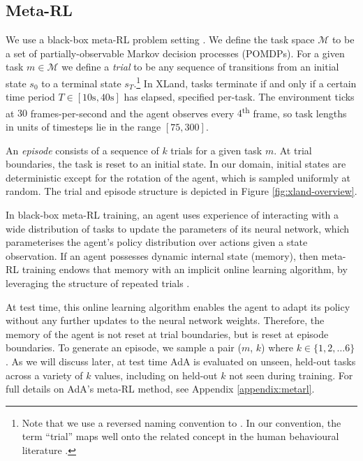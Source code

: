 \subsection{Meta-RL} \label{sec:methods_problem} 

We use a black-box meta-RL problem setting \citep{duan2017rl, wang2016learning}. We define the task space $\mathcal{M}$ to be a set of partially-observable Markov decision processes (POMDPs). For a given task $m \in \mathcal{M}$ we define a \emph{trial} to be any sequence of transitions from an initial state $s_0$ to a terminal state $s_T$.\footnote{Note that we use a reversed naming convention to \citet{duan2017rl}. In our convention, the term ``trial'' maps well onto the related concept in the human behavioural literature \citep{barbosa2022practical}.} In XLand, tasks terminate if and only if a certain time period $T \in [10\textrm{s}, 40\textrm{s}]$ has elapsed, specified per-task. The environment ticks at $30$ frames-per-second and the agent observes every $4$\textsuperscript{th} frame, so task lengths in units of timesteps lie in the range $[75, 300]$.

An \emph{episode} consists of a sequence of $k$ trials for a given task $m$. At trial boundaries, the task is reset to an initial state. In our domain, initial states are deterministic except for the rotation of the agent, which is sampled uniformly at random. The trial and episode structure is depicted in Figure \ref{fig:xland-overview}.

In black-box meta-RL training, an agent uses experience of interacting with a wide distribution of tasks to update the parameters of its neural network, which parameterises the agent's policy distribution over actions given a state observation. If an agent possesses dynamic internal state (memory), then meta-RL training endows that memory with an implicit online learning algorithm, by leveraging the structure of repeated trials \citep{mikulik2020metatrained}. 

At test time, this online learning algorithm enables the agent to adapt its policy without any further updates to the neural network weights. Therefore, the memory of the agent is not reset at trial boundaries, but is reset at episode boundaries. To generate an episode, we sample a pair ($m$, $k$) where $k \in \{1,2, \dots 6\}$. As we will discuss later, at test time AdA is evaluated on unseen, held-out tasks across a variety of $k$ values, including on held-out $k$ not seen during training. For full details on AdA's meta-RL method, see Appendix \ref{appendix:metarl}. 